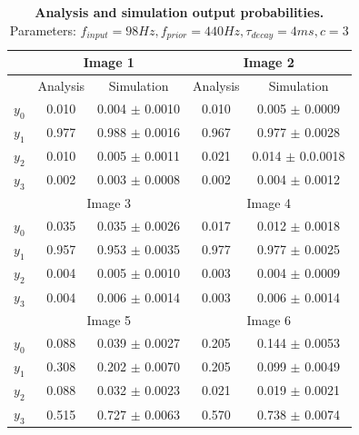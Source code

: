 \begin{table}[]
\label{tab:1DTrainingEvaluationC3}
\small
\tabcolsep=0.11cm
\begin{tabular}{|c|cc|cc|}
\hline
                       & \multicolumn{2}{c|}{Image 1}                       & \multicolumn{2}{c|}{Image 2}                       \\ \hline
                       & \multicolumn{1}{c|}{Analysis} & Simulation         & \multicolumn{1}{c|}{Analysis} & Simulation         \\ \hline
$y_0$                  & \multicolumn{1}{c|}{0.010}    & 0.004 $\pm$ 0.0010 & \multicolumn{1}{c|}{0.010}    & 0.005 $\pm$ 0.0009 \\ \hline
$y_1$                  & \multicolumn{1}{c|}{0.977}    & 0.988 $\pm$ 0.0016 & \multicolumn{1}{c|}{0.967}    & 0.977 $\pm$ 0.0028 \\ \hline
$y_2$                  & \multicolumn{1}{c|}{0.010}    & 0.005 $\pm$ 0.0011 & \multicolumn{1}{c|}{0.021}    & 0.014 $\pm$ 0.0.0018 \\ \hline
$y_3$                  & \multicolumn{1}{c|}{0.002}    & 0.003 $\pm$ 0.0008 & \multicolumn{1}{c|}{0.002}    & 0.004 $\pm$ 0.0012 \\ \hline
                       & \multicolumn{2}{c|}{Image 3}                       & \multicolumn{2}{c|}{Image 4}                       \\ \hline
$y_0$                  & \multicolumn{1}{c|}{0.035}    & 0.035 $\pm$ 0.0026 & \multicolumn{1}{c|}{0.017}    & 0.012 $\pm$ 0.0018 \\ \hline
$y_1$                  & \multicolumn{1}{c|}{0.957}    & 0.953 $\pm$ 0.0035 & \multicolumn{1}{c|}{0.977}    & 0.977 $\pm$ 0.0025 \\ \hline
$y_2$                  & \multicolumn{1}{c|}{0.004}    & 0.005 $\pm$ 0.0010 & \multicolumn{1}{c|}{0.003}    & 0.004 $\pm$ 0.0009 \\ \hline
$y_3$                  & \multicolumn{1}{c|}{0.004}    & 0.006 $\pm$ 0.0014 & \multicolumn{1}{c|}{0.003}    & 0.006 $\pm$ 0.0014 \\ \hline
						& \multicolumn{2}{c|}{Image 5}                       & \multicolumn{2}{c|}{Image 6}                       \\ \hline
$y_0$                  & \multicolumn{1}{c|}{0.088}    & 0.039 $\pm$ 0.0027 & \multicolumn{1}{c|}{0.205}    & 0.144 $\pm$ 0.0053 \\ \hline
$y_1$                  & \multicolumn{1}{c|}{0.308}    & 0.202 $\pm$ 0.0070 & \multicolumn{1}{c|}{0.205}    & 0.099 $\pm$ 0.0049 \\ \hline
$y_2$                  & \multicolumn{1}{c|}{0.088}    & 0.032 $\pm$ 0.0023 & \multicolumn{1}{c|}{0.021}    & 0.019 $\pm$ 0.0021 \\ \hline
$y_3$                  & \multicolumn{1}{c|}{0.515}    & 0.727 $\pm$ 0.0063 & \multicolumn{1}{c|}{0.570}    & 0.738 $\pm$ 0.0074 \\ \hline
\end{tabular}
\caption{\textbf{Analysis and simulation output probabilities. } Parameters: $f_{input} = 98 Hz, f_{prior} = 440 Hz, \tau_{decay} = 4 ms, c = 3$}
\end{table}


